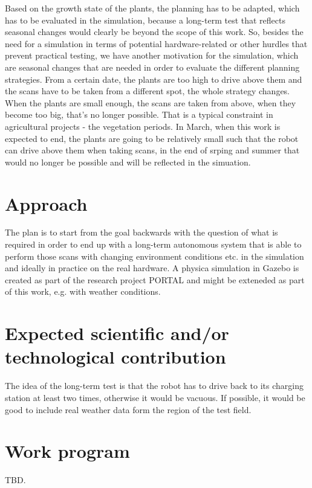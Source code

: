\documentclass[german, master, expose, latin1]{base/thesis_KBS}
\begin{document}
Based on the growth state of the plants, the planning has to be adapted, which has to be evaluated in the simulation, because a long-term test that reflects
seasonal changes would clearly be beyond the scope of this work. So, besides the need for a simulation in terms of potential hardware-related or other hurdles
that prevent practical testing, we have another motivation for the simulation, which are seasonal changes that are needed in order to evaluate the different
planning strategies. From a certain date, the plants are too high to drive above them and the scans have to be taken from a different spot, the whole strategy changes.
When the plants are small enough, the scans are taken from above, when they become too big, that's no longer possible.
That is a typical constraint in agricultural projects - the vegetation periods.
In March, when this work is expected to end, the plants are going to be relatively small such that the robot can drive above them when taking
scans, in the end of srping and summer that would no longer be possible and will be reflected in the simuation.

\section{Approach}

The plan is to start from the goal backwards with the question of what is required in order to end up with a long-term autonomous system that is
able to perform those scans with changing environment conditions etc. in the simulation and ideally in practice on the real hardware.
A physica simulation in Gazebo is created as part of the research project PORTAL and might be exteneded as part of this work, e.g. with weather conditions.

\section{Expected scientific and/or technological contribution}

The idea of the long-term test is that the robot has to drive back to its charging station at least two times, otherwise it would be vacuous.
If possible, it would be good to include real weather data form the region of the test field.

\section{Work program}

TBD.


\end{document}
